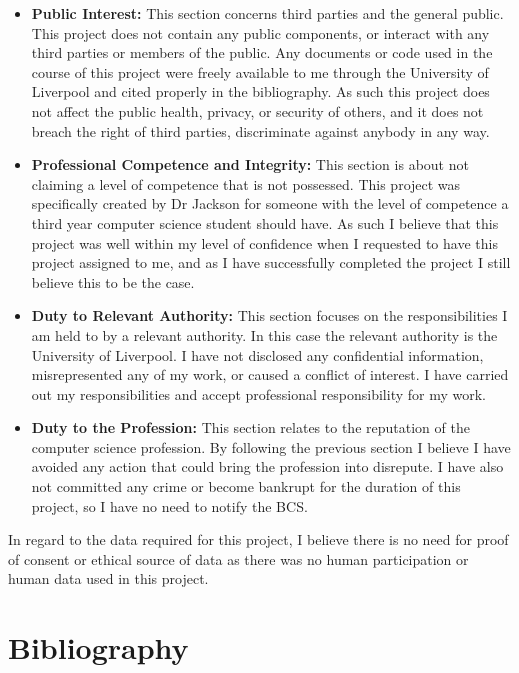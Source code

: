\documentclass{article}
\begin{document}
    	\begin{itemize}
    		\item \textbf{Public Interest:} This section concerns third parties and the general public. This project does not contain any public components, or interact with any third parties or members of the public. Any documents or code used in the course of this project were freely available to me through the University of Liverpool and cited properly in the bibliography. As such this project does not affect  the public health, privacy, or security of others, and it does not breach the right of third parties, discriminate against anybody in any way.
    		
    		\item \textbf{Professional Competence and Integrity:} This section is about not claiming a level of competence that is not possessed. This project was specifically created by Dr Jackson for someone with the level of competence a third year computer science student should have. As such I believe that this project was well within my level of confidence when I requested to have this project assigned to me, and as I have successfully completed the project I still believe this to be the case.
    		
    		\item \textbf{Duty to Relevant Authority:} This section focuses on the responsibilities I am held to by a relevant authority. In this case the relevant authority is the University of Liverpool. I have not disclosed any confidential information, misrepresented any of my work, or caused a conflict of interest. I have carried out my responsibilities and accept professional responsibility for my work.
    		
    		\item \textbf{Duty to the Profession:} This section relates to the reputation of the computer science profession. By following the previous section I believe I have avoided any action that could bring the profession into disrepute. I have also not committed any crime or become bankrupt for the duration of this project, so I have no need to notify the BCS.
    	\end{itemize}
    
    	In regard to the data required for this project, I believe there is no need for proof of consent or ethical source of data as there was no human participation or human data used in this project.

    \section{Bibliography}
\end{document}

